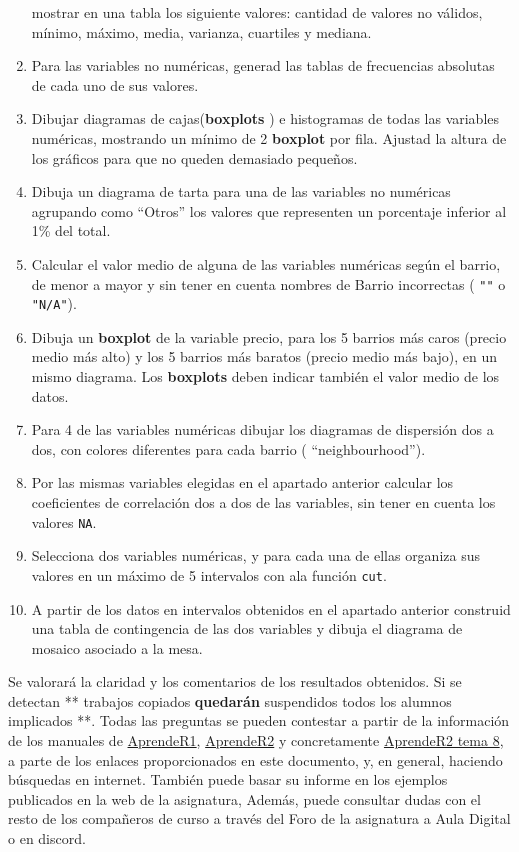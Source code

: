 \documentclass[
]{article}
\begin{document}
\begin{enumerate}
  mostrar en una tabla los siguiente valores: cantidad de valores no
  válidos, mínimo, máximo, media, varianza, cuartiles y mediana.
\item
  Para las variables no numéricas, generad las tablas de frecuencias
  absolutas de cada uno de sus valores.
\item
  Dibujar diagramas de cajas(\textbf{boxplots }) e histogramas de todas
  las variables numéricas, mostrando un mínimo de 2 \textbf{boxplot} por
  fila. Ajustad la altura de los gráficos para que no queden demasiado
  pequeños.
\item
  Dibuja un diagrama de tarta para una de las variables no numéricas
  agrupando como ``Otros'' los valores que representen un porcentaje
  inferior al 1\% del total.
\item
  Calcular el valor medio de alguna de las variables numéricas según el
  barrio, de menor a mayor y sin tener en cuenta nombres de Barrio
  incorrectas ( \texttt{""} o \texttt{"N/A"}).
\item
  Dibuja un \textbf{boxplot} de la variable precio, para los 5 barrios
  más caros (precio medio más alto) y los 5 barrios más baratos (precio
  medio más bajo), en un mismo diagrama. Los \textbf{boxplots} deben
  indicar también el valor medio de los datos.
\item
  Para 4 de las variables numéricas dibujar los diagramas de dispersión
  dos a dos, con colores diferentes para cada barrio (
  ``neighbourhood'').
\item
  Por las mismas variables elegidas en el apartado anterior calcular los
  coeficientes de correlación dos a dos de las variables, sin tener en
  cuenta los valores \texttt{NA}.
\item
  Selecciona dos variables numéricas, y para cada una de ellas organiza
  sus valores en un máximo de 5 intervalos con ala función \texttt{cut}.
\item
  A partir de los datos en intervalos obtenidos en el apartado anterior
  construid una tabla de contingencia de las dos variables y dibuja el
  diagrama de mosaico asociado a la mesa.
\end{enumerate}

Se valorará la claridad y los comentarios de los resultados obtenidos.
Si se detectan ** trabajos copiados \textbf{ quedarán } suspendidos
todos los alumnos implicados **. Todas las preguntas se pueden contestar
a partir de la información de los manuales de
\href{https://aprender-uib.github.io/AprendeR1/}{AprendeR1},
\href{https://aprender-uib.github.io/AprendeR2/}{AprendeR2} y
concretamente
\href{https://aprender-uib.github.io/AprendeR2/chap-estmult.html}{AprendeR2
tema 8}, a parte de los enlaces proporcionados en este documento, y, en
general, haciendo búsquedas en internet. También puede basar su informe
en los ejemplos publicados en la web de la asignatura, Además, puede
consultar dudas con el resto de los compañeros de curso a través del
Foro de la asignatura a Aula Digital o en discord.
\end{document}
